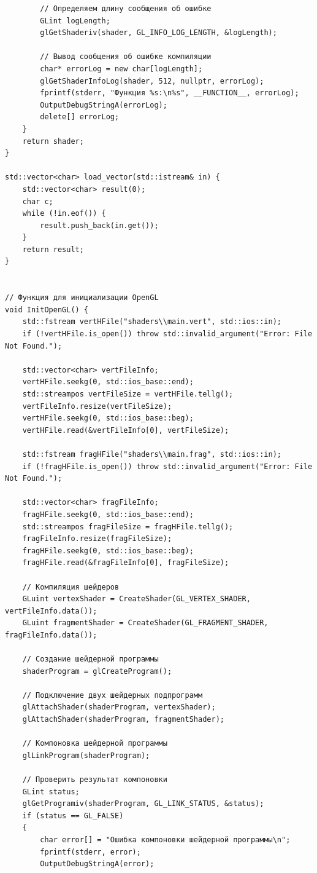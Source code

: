 \documentclass[a4paper,14pt]{extarticle}
\begin{document}
\begin{verbatim}
		// Определяем длину сообщения об ошибке
		GLint logLength;
		glGetShaderiv(shader, GL_INFO_LOG_LENGTH, &logLength);

		// Вывод сообщения об ошибке компиляции
		char* errorLog = new char[logLength];
		glGetShaderInfoLog(shader, 512, nullptr, errorLog);
		fprintf(stderr, "Функция %s:\n%s", __FUNCTION__, errorLog);
		OutputDebugStringA(errorLog);
		delete[] errorLog;
	}
	return shader;
}

std::vector<char> load_vector(std::istream& in) {
	std::vector<char> result(0);
	char c;
	while (!in.eof()) {
		result.push_back(in.get());
	}
	return result;
}


// Функция для инициализации OpenGL
void InitOpenGL() {
	std::fstream vertHFile("shaders\\main.vert", std::ios::in);
	if (!vertHFile.is_open()) throw std::invalid_argument("Error: File Not Found.");

	std::vector<char> vertFileInfo;
	vertHFile.seekg(0, std::ios_base::end);
	std::streampos vertFileSize = vertHFile.tellg();
	vertFileInfo.resize(vertFileSize);
	vertHFile.seekg(0, std::ios_base::beg);
	vertHFile.read(&vertFileInfo[0], vertFileSize);

	std::fstream fragHFile("shaders\\main.frag", std::ios::in);
	if (!fragHFile.is_open()) throw std::invalid_argument("Error: File Not Found.");

	std::vector<char> fragFileInfo;
	fragHFile.seekg(0, std::ios_base::end);
	std::streampos fragFileSize = fragHFile.tellg();
	fragFileInfo.resize(fragFileSize);
	fragHFile.seekg(0, std::ios_base::beg);
	fragHFile.read(&fragFileInfo[0], fragFileSize);

	// Компиляция шейдеров
	GLuint vertexShader = CreateShader(GL_VERTEX_SHADER, vertFileInfo.data());
	GLuint fragmentShader = CreateShader(GL_FRAGMENT_SHADER, fragFileInfo.data());

	// Создание шейдерной программы
	shaderProgram = glCreateProgram();

	// Подключение двух шейдерных подпрограмм 
	glAttachShader(shaderProgram, vertexShader);
	glAttachShader(shaderProgram, fragmentShader);

	// Компоновка шейдерной программы
	glLinkProgram(shaderProgram);

	// Проверить результат компоновки
	GLint status;
	glGetProgramiv(shaderProgram, GL_LINK_STATUS, &status);
	if (status == GL_FALSE)
	{
		char error[] = "Ошибка компоновки шейдерной программы\n";
		fprintf(stderr, error);
		OutputDebugStringA(error);


\end{verbatim}
\end{document}
